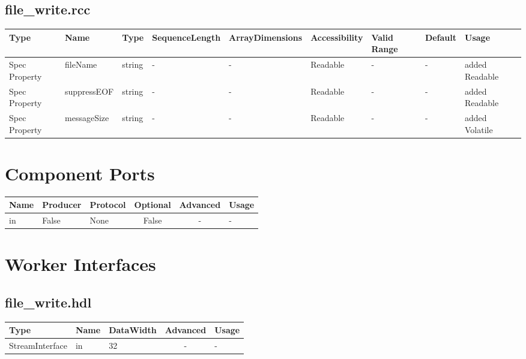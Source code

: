 \documentclass{article}
\def\comp{file\_write}
\begin{document}
\begin{landscape}
	\subsection*{\comp.rcc}
	\begin{scriptsize}
    \begin{tabular}{|p{2cm}|p{2.75cm}|p{3.5cm}|p{2cm}|p{2cm}|p{2.25cm}|p{1.5cm}|p{1cm}|p{4cm}|}
			\hline
			\rowcolor{blue}
			Type     & Name                      & Type  & SequenceLength & ArrayDimensions & Accessibility       & Valid Range & Default & Usage                                      \\
			\hline
			Spec Property & fileName & string  & - & - & Readable & -  &- & added Readable \\
			\hline
			Spec Property & suppressEOF & string  & - & - & Readable & -  &- & added Readable \\
			\hline
			Spec Property & messageSize & string  & - & - & Readable & -  &- & added Volatile \\
			\hline
			
    \end{tabular}
	\end{scriptsize}

	\section*{Component Ports}
	\begin{scriptsize}
\begin{tabular}{|M{2cm}|M{1.5cm}|M{4cm}|c|c|M{9cm}|}
\hline
{}
Name & Producer & Protocol & Optional & Advanced & Usage
\\
\hline
in & False & None& False & - & -\\
\hline
\end{tabular}
	\end{scriptsize}

	\section*{Worker Interfaces}
	\subsection*{\comp.hdl}
	\begin{scriptsize}
\begin{tabular}{|M{2cm}|M{1.5cm}|M{4cm}|c|M{12cm}|}
\hline
{}
Type & Name & DataWidth & Advanced & Usage
\\
\hline
StreamInterface & in & 32 & - & -\\
\hline
\end{tabular}
	\end{scriptsize}
	

\end{landscape}
\end{document}
